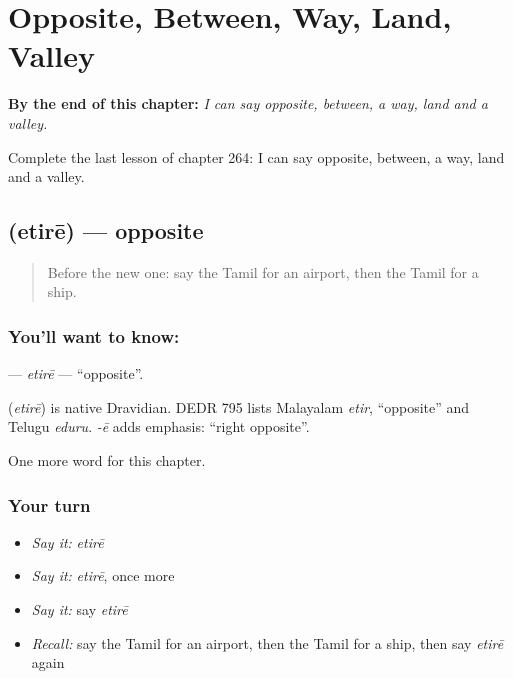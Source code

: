 
\chapter{Opposite, Between, Way, Land, Valley}
\label{ch:ta-opposite-between-way-land-valley}

\begin{chapteropening}
\textbf{By the end of this chapter:} \emph{I can say opposite, between, a way, land and a valley.}

Complete the last lesson of chapter 264: I can say opposite, between, a way, land and a valley.
\end{chapteropening}

\section[\texorpdfstring{\ta{எதிரே} (etirē)}{எதிரே (etirē)}]{ (etirē) — opposite}

\label{lesson:TA-C264-etire}



\begin{quote}
Before the new one: say the Tamil for an airport, then the Tamil for a ship.
\end{quote}

\subsection*{You'll want to know: }
\textbf{} — \emph{etirē} — \textquotedblleft{}opposite\textquotedblright{}.

\begin{cousinweb}
\textbf{} (\emph{etirē}) is native Dravidian. DEDR 795 lists Malayalam \emph{etir}, \textquotedblleft{}opposite\textquotedblright{} and Telugu \emph{eduru}. \emph{-ē} adds emphasis: \textquotedblleft{}right opposite\textquotedblright{}.
\end{cousinweb}

\begin{grammarlens}[title={What you've built}]
One more word for this chapter.
\end{grammarlens}

\subsection*{Your turn}
\begin{itemize}
\raggedright
  \item \emph{Say it:} \emph{etirē}
  \item \emph{Say it:} \emph{etirē}, once more
  \item \emph{Say it:} say \emph{etirē}
  \item \emph{Recall:} say the Tamil for an airport, then the Tamil for a ship, then say \emph{etirē} again
\end{itemize}

